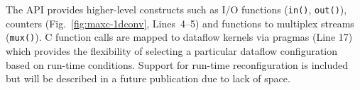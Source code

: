 The \FAST{} API provides higher-level constructs such as I/O functions
(\texttt{in()}, \texttt{out()}), counters (Fig.~\ref{fig:maxc-1dconv},
Lines~4--5) and functions to multiplex streams (\texttt{mux()}). C
function calls are mapped to dataflow kernels via pragmas (Line 17)
which provides the flexibility of selecting a particular dataflow
configuration based on run-time conditions. Support for run-time
reconfiguration is included but will be described in a future
publication due to lack of space.

